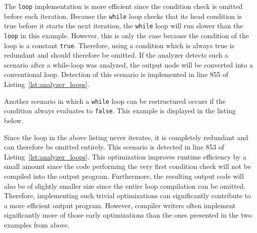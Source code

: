 The \texttt{loop} implementation is more efficient since the condition check is omitted before each iteration.
Because the \texttt{while} loop checks that its head condition is true before it starts the next iteration,
the \texttt{while} loop will run slower than the \texttt{loop} in this example.
However, this is only the case because the condition of the loop is a constant \texttt{true}.
Therefore, using a condition which is always true is redundant and should therefore be omitted.
If the analyzer detects such a scenario after a while-loop was analyzed, the output node will be converted into a conventional loop.
Detection of this scenario is implemented in line 855 of Listing~\ref{lst:analyzer_loops}.


Another scenario in which a \texttt{while} loop can be restructured occurs if the condition always evaluates to \texttt{false}.
This example is displayed in the listing below.


Since the loop in the above listing never iterates, it is completely redundant and can therefore be omitted entirely.
This scenario is detected in line 853 of Listing~\ref{lst:analyzer_loops}.
This optimization improves runtime efficiency by a small amount since the code performing the very first condition check will not be compiled into the output program.
Furthermore, the resulting output code will also be of slightly smaller size since the entire loop compilation can be omitted.
Therefore, implementing such trivial optimizations can significantly contribute to a more efficient output program.
However, compiler writers often implement significantly more of those early optimizations than the ones presented in the two examples from above.
